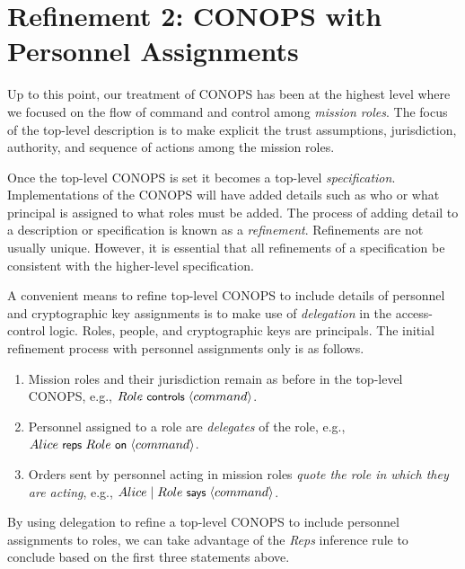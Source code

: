 \section{Refinement 2: CONOPS with Personnel Assignments}
\label{sec:conops-with-personnel}

Up to this point, our treatment of CONOPS has been at the highest
level where we focused on the flow of command and control among
\emph{mission roles}. The focus of the top-level description is to
make explicit the trust assumptions, jurisdiction, authority, and
sequence of actions among the mission roles.

Once the top-level CONOPS is set it becomes a top-level
\emph{specification}. Implementations of the CONOPS will have added
details such as who or what principal is assigned to what roles must
be added. The process of adding detail to a description or
specification is known as a \emph{refinement}. Refinements are not
usually unique. However, it is essential that all refinements of a
specification be consistent with the higher-level specification.

A convenient means to refine top-level CONOPS to include details of
personnel and cryptographic key assignments is to make use of
\emph{delegation} in the access-control logic. Roles, people, and
cryptographic keys are principals. The initial refinement process with
personnel assignments only is as follows.
\begin{enumerate}
\item Mission roles and their jurisdiction remain as before in the
  top-level CONOPS, e.g., $Role \text{\small\textsf{ controls }} \langle command \rangle$.
\item Personnel assigned to a role are \emph{delegates} of the role,
  e.g., ${Alice} \text{\small\textsf{ reps }}{Role}{\text{\small\textsf{ on }}}{\ensuremath{\langle command \rangle}}$.
\item Orders sent by personnel acting in mission roles \emph{quote the
    role in which they are acting}, e.g., $Alice \;|\; Role \text{\small\textsf{ says }}
  \langle command \rangle$.
\end{enumerate}

By using delegation to refine a top-level CONOPS to include personnel
assignments to roles, we can take advantage of the \emph{Reps}
inference rule to conclude  based on the first three
statements above.

